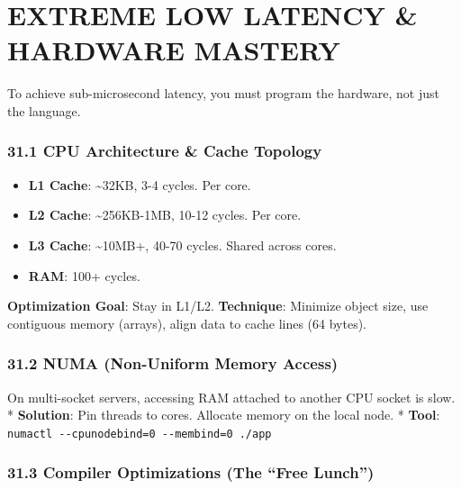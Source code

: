 \hypertarget{extreme-low-latency-hardware-mastery}{%
\chapter{EXTREME LOW LATENCY \& HARDWARE
MASTERY}\label{extreme-low-latency-hardware-mastery}}

To achieve sub-microsecond latency, you must program the hardware, not
just the language.

\hypertarget{cpu-architecture-cache-topology}{%
\subsection{31.1 CPU Architecture \& Cache
Topology}\label{cpu-architecture-cache-topology}}

\begin{itemize}
\tightlist
\item
  \textbf{L1 Cache}: \textasciitilde32KB, 3-4 cycles. Per core.
\item
  \textbf{L2 Cache}: \textasciitilde256KB-1MB, 10-12 cycles. Per core.
\item
  \textbf{L3 Cache}: \textasciitilde10MB+, 40-70 cycles. Shared across
  cores.
\item
  \textbf{RAM}: 100+ cycles.
\end{itemize}

\textbf{Optimization Goal}: Stay in L1/L2. \textbf{Technique}: Minimize
object size, use contiguous memory (arrays), align data to cache lines
(64 bytes).

\hypertarget{numa-non-uniform-memory-access}{%
\subsection{31.2 NUMA (Non-Uniform Memory
Access)}\label{numa-non-uniform-memory-access}}

On multi-socket servers, accessing RAM attached to another CPU socket is
slow. * \textbf{Solution}: Pin threads to cores. Allocate memory on the
local node. * \textbf{Tool}:
\passthrough{\lstinline!numactl --cpunodebind=0 --membind=0 ./app!}

\hypertarget{compiler-optimizations-the-free-lunch}{%
\subsection{31.3 Compiler Optimizations (The ``Free
Lunch'')}\label{compiler-optimizations-the-free-lunch}}

